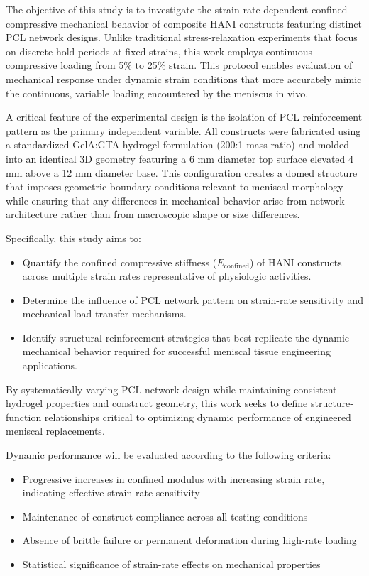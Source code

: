 The objective of this study is to investigate the strain-rate dependent confined compressive mechanical behavior of composite HANI constructs featuring distinct PCL network designs. Unlike traditional stress-relaxation experiments that focus on discrete hold periods at fixed strains, this work employs continuous compressive loading from 5\% to 25\% strain. This protocol enables evaluation of mechanical response under dynamic strain conditions that more accurately mimic the continuous, variable loading encountered by the meniscus in vivo.

A critical feature of the experimental design is the isolation of PCL reinforcement pattern as the primary independent variable. All constructs were fabricated using a standardized GelA:GTA hydrogel formulation (200:1 mass ratio) and molded into an identical 3D geometry featuring a 6 mm diameter top surface elevated 4 mm above a 12 mm diameter base. This configuration creates a domed structure that imposes geometric boundary conditions relevant to meniscal morphology while ensuring that any differences in mechanical behavior arise from network architecture rather than from macroscopic shape or size differences.

Specifically, this study aims to:
\begin{itemize}
    \item Quantify the confined compressive stiffness ($E_{\text{confined}}$) of HANI constructs across multiple strain rates representative of physiologic activities.
    \item Determine the influence of PCL network pattern on strain-rate sensitivity and mechanical load transfer mechanisms.
    \item Identify structural reinforcement strategies that best replicate the dynamic mechanical behavior required for successful meniscal tissue engineering applications.
\end{itemize}

By systematically varying PCL network design while maintaining consistent hydrogel properties and construct geometry, this work seeks to define structure-function relationships critical to optimizing dynamic performance of engineered meniscal replacements.

Dynamic performance will be evaluated according to the following criteria:
\begin{itemize}
    \item Progressive increases in confined modulus with increasing strain rate, indicating effective strain-rate sensitivity
    \item Maintenance of construct compliance across all testing conditions
    \item Absence of brittle failure or permanent deformation during high-rate loading
    \item Statistical significance of strain-rate effects on mechanical properties
\end{itemize}

